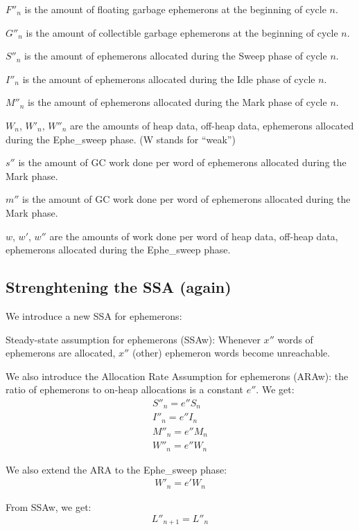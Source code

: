 \documentclass{article}
\begin{document}
$F''_n$ is the amount of floating garbage ephemerons at the beginning
of cycle $n$.

$G''_n$ is the amount of collectible garbage ephemerons at the
beginning of cycle $n$.

$S''_n$ is the amount of ephemerons allocated during the Sweep phase
of cycle $n$.

$I''_n$ is the amount of ephemerons allocated during the Idle phase
of cycle $n$.

$M''_n$ is the amount of ephemerons allocated during the Mark phase
of cycle $n$.

$W_n$, $W'_n$, $W''_n$ are the amounts of heap data, off-heap
data, ephemerons allocated during the Ephe\_sweep phase. (W stands for
``weak'')

$s''$ is the amount of GC work done per word of ephemerons allocated
during the Mark phase.

$m''$ is the amount of GC work done per word of ephemerons allocated
during the Mark phase.

$w$, $w'$, $w''$ are the amounts of work done per word of
heap data, off-heap data, ephemerons allocated during the Ephe\_sweep
phase.


\subsection{Strenghtening the SSA (again)}

We introduce a new SSA for ephemerons:

Steady-state assumption for ephemerons (SSAw): Whenever $x''$
words of ephemerons are allocated, $x''$ (other) ephemeron words
become unreachable.

We also introduce the Allocation Rate Assumption for ephemerons
(ARAw): the ratio of ephemerons to on-heap allocations is a constant
$e''$. We get:
\begin{gather}
S''_n = e''S_n \label{eqn-S''} \\
I''_n = e''I_n \label{eqn-I''} \\
M''_n = e''M_n \label{eqn-M''} \\
W''_n = e''W_n \label{eqn-W''}
\end{gather}

We also extend the ARA to the Ephe\_sweep phase:
\begin{gather}
W'_n = e'W_n  \label{eqn-W'}
\end{gather}

From SSAw, we get:
\begin{equation}
L''_{n+1} = L''_n
\end{equation}
\end{document}
